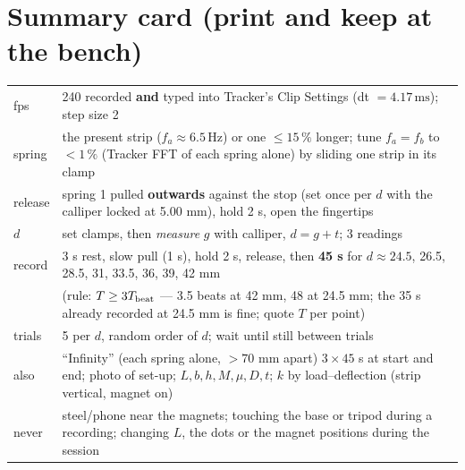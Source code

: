 \documentclass[11pt,a4paper]{article}
\newcommand{\un}[1]{\,\mathrm{#1}}
\begin{document}
\section*{Summary card (print and keep at the bench)}
\begin{center}\small
\begin{tabular}{@{}lp{13.5cm}@{}}
\toprule
fps & 240 recorded \textbf{and} typed into Tracker's Clip Settings (dt $=4.17\un{ms}$); step size 2\\
spring & the present strip ($f_a\approx6.5\un{Hz}$) or one $\le15\,\%$ longer; tune $f_a=f_b$ to $<1\,\%$ (Tracker FFT of each spring alone) by sliding one strip in its clamp\\
release & spring 1 pulled \textbf{outwards} against the stop (set once per $d$ with the calliper locked at 5.00 mm), hold 2 s, open the fingertips\\
$d$ & set clamps, then \emph{measure} $g$ with calliper, $d=g+t$; 3 readings\\
record & 3 s rest, slow pull (1 s), hold 2 s, release, then \textbf{45 s} for $d\approx24.5$, 26.5, 28.5, 31, 33.5, 36, 39, 42 mm\\
 & (rule: $T\ge3T_{\rm beat}$ --- 3.5 beats at 42 mm, 48 at 24.5 mm; the 35 s already recorded at 24.5 mm is fine; quote $T$ per point)\\
trials & 5 per $d$, random order of $d$; wait until still between trials\\
also & ``Infinity'' (each spring alone, $>70$ mm apart) $3\times45$ s at start and end; photo of set-up; $L,b,h,M,\mu,D,t$; $k$ by load--deflection (strip vertical, magnet on)\\
never & steel/phone near the magnets; touching the base or tripod during a recording; changing $L$, the dots or the magnet positions during the session\\
\bottomrule
\end{tabular}
\end{center}
\end{document}
